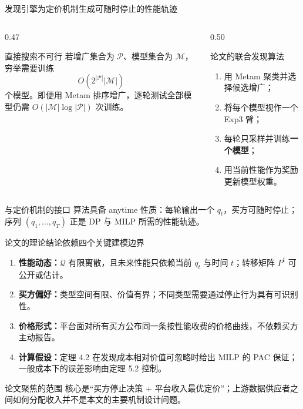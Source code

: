 \documentclass[10pt,aspectratio=169]{beamer}
\newcommand{\key}[1]{\textcolor{ZJUBlue}{\textbf{#1}}}
\begin{document}
\begin{frame}{发现引擎为定价机制生成可随时停止的性能轨迹}
  \begin{columns}[T,onlytextwidth]
    \begin{column}{0.47\textwidth}
      \begin{block}{直接搜索不可行}
        若增广集合为 $\mathcal P$、模型集合为 $\mathcal M$，穷举需要训练
        \[
          O\!\left(2^{|\mathcal P|}|\mathcal M|\right)
        \]
        个模型。即便用 Metam 排序增广，逐轮测试全部模型仍需
        $O(|\mathcal M|\log|\mathcal P|)$ 次训练。
      \end{block}
    \end{column}
    \begin{column}{0.50\textwidth}
      \begin{alertblock}{论文的联合发现算法}
        \begin{enumerate}
          \item 用 Metam 聚类并选择候选增广；
          \item 将每个模型视作一个 Exp3 臂；
          \item 每轮只采样并训练\key{一个模型}；
          \item 用当前性能作为奖励更新模型权重。
        \end{enumerate}
      \end{alertblock}
    \end{column}
  \end{columns}
  \vspace{0.5em}
  \begin{block}{与定价机制的接口}
    算法具备 anytime 性质：每轮输出一个 $q_t$，买方可随时停止；序列 $(q_1,\ldots,q_T)$ 正是 DP 与 MILP 所需的性能轨迹。
  \end{block}
\end{frame}

\begin{frame}{论文的理论结论依赖四个关键建模边界}
  \begin{enumerate}
    \item \key{性能动态：}$\mathcal Q$ 有限离散，且未来性能只依赖当前 $q_t$ 与时间 $t$；转移矩阵 $P^t$ 可公开或估计。
    \item \key{买方偏好：}类型空间有限、价值有界；不同类型需要通过停止行为具有可识别性。
    \item \key{价格形式：}平台面对所有买方公布同一条按性能收费的价格曲线，不依赖买方主动报告。
    \item \key{计算假设：}定理 4.2 在发现成本相对价值可忽略时给出 MILP 的 PAC 保证；一般成本下的误差影响由定理 5.2 控制。
  \end{enumerate}
  \vspace{0.45em}
  \begin{alertblock}{论文聚焦的范围}
    核心是“买方停止决策 + 平台收入最优定价”；上游数据供应者之间如何分配收入并不是本文的主要机制设计问题。
  \end{alertblock}
\end{frame}
\end{document}
